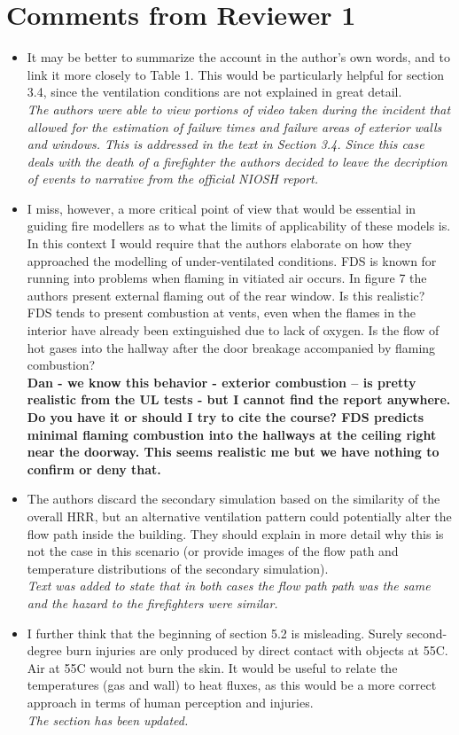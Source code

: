 \documentclass[12pt]{article}
\begin{document}
\section{Comments from Reviewer 1}
\begin{itemize}
\item It may be better to summarize the account in the author's own words, and to link it more closely to Table 1. This would be particularly helpful for section 3.4, since the ventilation conditions are not explained in great detail. \\
{\it The authors were able to view portions of video taken during the incident that allowed for the estimation of failure times and failure areas of exterior walls and windows. This is addressed in the text in Section 3.4. Since this case deals with the death of a firefighter the authors decided to leave the decription of events to narrative from the official NIOSH report.}
\item I miss, however, a more critical point of view that would be essential in guiding fire modellers as to what the limits of applicability of these models is. In this context I would require that the authors elaborate on how they approached the modelling of under-ventilated conditions. FDS is known for running into problems when flaming in vitiated air occurs. In figure 7 the authors present external flaming out of the rear window. Is this realistic? FDS tends to present combustion at vents, even when the flames in the interior have already been extinguished due to lack of oxygen. Is the flow of hot gases into the hallway after the door breakage accompanied by flaming combustion? \\
{\bf Dan - we know this behavior - exterior combustion -- is pretty realistic from the UL tests - but I cannot find the report anywhere. Do you have it or should I try to cite the course? FDS predicts minimal flaming combustion into the hallways at the ceiling right near the doorway. This seems realistic me but we have nothing to confirm or deny that.}
\item The authors discard the secondary simulation based on the similarity of the overall HRR, but an alternative ventilation pattern could potentially alter the flow path inside the building. They should explain in more detail why this is not the case in this scenario (or provide images of the flow path and temperature distributions of the secondary simulation). \\
{\it Text was added to state that in both cases the flow path path was the same and the hazard to the firefighters were similar.}
\item I further think that the beginning of section 5.2 is misleading. Surely second-degree burn injuries are only produced by direct contact with objects at 55C. Air at 55C would not burn the skin. It would be useful to relate the temperatures (gas and wall) to heat fluxes, as this would be a more correct approach in terms of human perception and injuries. \\
{\it The section has been updated.}
\end{itemize}
\end{document}
